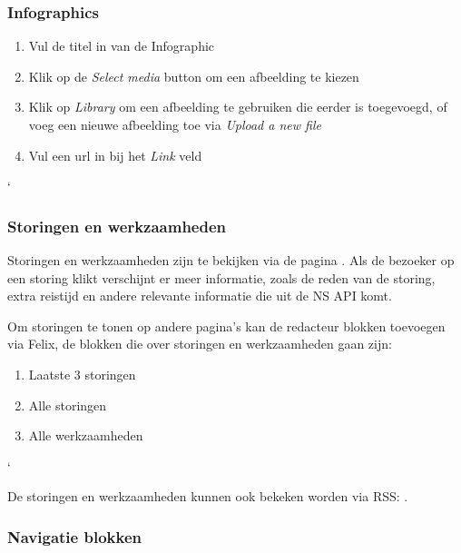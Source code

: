 \subsubsection{Infographics}
\begin{enumerate}
\item Vul de titel in van de Infographic
\item Klik op de \emph{Select media} button om een afbeelding te kiezen
\item Klik op \emph{Library} om een afbeelding te gebruiken die eerder is toegevoegd,  of voeg een nieuwe afbeelding toe via \emph{Upload a new file}
\item Vul een url in bij het \emph{Link} veld
\end{enumerate}`


\subsubsection{Storingen en werkzaamheden}
Storingen en werkzaamheden zijn te bekijken via de pagina . Als de bezoeker op een storing klikt verschijnt er meer informatie, zoals de reden van de storing, extra reistijd en andere relevante informatie die uit de NS API komt.

Om storingen te tonen op andere pagina's kan de redacteur blokken toevoegen via Felix, de blokken die over storingen en werkzaamheden gaan zijn:

\begin{enumerate}
\item Laatste 3 storingen
\item Alle storingen
\item Alle werkzaamheden
\end{enumerate}`

De storingen en werkzaamheden kunnen ook bekeken worden via RSS: .


\subsubsection{Navigatie blokken}


